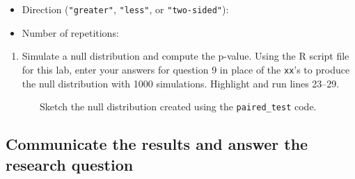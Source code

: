 \documentclass[
]{report}
\newenvironment{Shaded}{\begin{snugshade}}{\end{snugshade}}
\newcommand{\AttributeTok}[1]{\textcolor[rgb]{0.13,0.29,0.53}{#1}}
\newcommand{\CommentTok}[1]{\textcolor[rgb]{0.56,0.35,0.01}{\textit{#1}}}
\newcommand{\DecValTok}[1]{\textcolor[rgb]{0.00,0.00,0.81}{#1}}
\newcommand{\FunctionTok}[1]{\textcolor[rgb]{0.13,0.29,0.53}{\textbf{#1}}}
\newcommand{\NormalTok}[1]{#1}
\newcommand{\SpecialCharTok}[1]{\textcolor[rgb]{0.81,0.36,0.00}{\textbf{#1}}}
\newcommand{\StringTok}[1]{\textcolor[rgb]{0.31,0.60,0.02}{#1}}
\providecommand{\tightlist}{%
  \setlength{\itemsep}{0pt}\setlength{\parskip}{0pt}}
\begin{document}
\begin{itemize}
\tightlist
\item
  Direction (\texttt{"greater"}, \texttt{"less"}, or \texttt{"two-sided"}):
\end{itemize}

\vspace{.1in}

\begin{itemize}
\tightlist
\item
  Number of repetitions:
\end{itemize}

\vspace{.1in}

\begin{enumerate}
\def\labelenumi{\arabic{enumi}.}
\setcounter{enumi}{9}
\tightlist
\item
  Simulate a null distribution and compute the p-value. Using the R script file for this lab, enter your answers for question 9 in place of the \texttt{xx}'s to produce the null distribution with 1000 simulations. Highlight and run lines 23--29.
\end{enumerate}

\begin{Shaded}
\end{Shaded}

~~~~~~~Sketch the null distribution created using the \texttt{paired\_test} code.

\vspace{1.5in}

\subsection*{Communicate the results and answer the research question}\label{communicate-the-results-and-answer-the-research-question-3}
\end{document}
